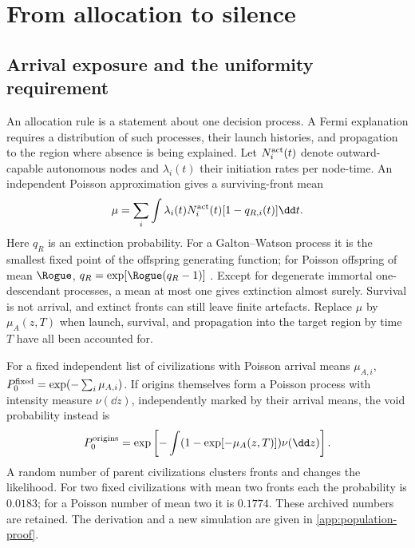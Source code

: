 \section{From allocation to silence}
\label{sec:population}
\subsection{Arrival exposure and the uniformity requirement}
An allocation rule is a statement about one decision process. A Fermi
explanation requires a distribution of such processes, their launch
histories, and propagation to the region where absence is being explained.
Let $N_i^{\rm act}(t)$ denote outward-capable autonomous nodes and
$\lambda_i(t)$ their initiation rates per node-time. An independent
Poisson approximation gives a surviving-front mean
\begin{equation}
 \mu=\sum_i\int\lambda_i(t)N_i^{\rm act}(t)[1-q_{R,i}(t)]\dd t.
 \label{eq:mu}
\end{equation}
Here $q_R$ is an extinction probability. For a Galton--Watson process it
is the smallest fixed point of the offspring generating function; for
Poisson offspring of mean $\Rogue$,
$q_R=\exp[\Rogue(q_R-1)]$ \citep{Harris1963}. Except for degenerate
immortal one-descendant processes, a mean at most one gives extinction
almost surely. Survival is not arrival, and extinct fronts can still
leave finite artefacts. Replace $\mu$ by $\mu_A(z,T)$ when launch,
survival, and propagation into the target region by time $T$ have all
been accounted for.

For a fixed independent list of civilizations with Poisson arrival
means $\mu_{A,i}$, $P_0^{\rm fixed}=\exp(-\sum_i\mu_{A,i})$.
If origins themselves form a Poisson process with intensity measure
$\nu(\dd z)$, independently marked by their arrival means, the void
probability instead is
\begin{equation}
 P_0^{\rm origins}
 =\exp\left[-\int(1-\exp[-\mu_A(z,T)])\nu(\dd z)\right].
 \label{eq:origins}
\end{equation}
A random number of parent civilizations clusters fronts and changes the
likelihood. For two fixed civilizations with mean two fronts each the
probability is $0.0183$; for a Poisson number of mean two it is $0.1774$.
These archived numbers are retained. The derivation and a new simulation
are given in \cref{app:population-proof}.

